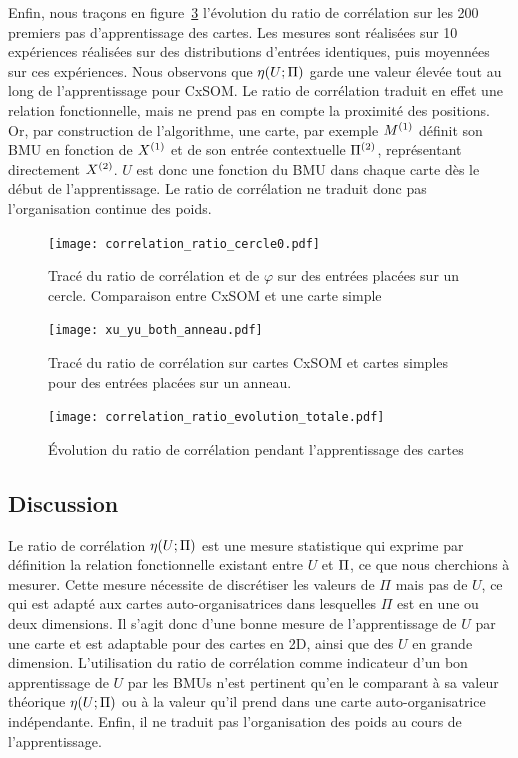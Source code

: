 \documentclass[../main]{subfiles}
\begin{document}
Enfin, nous traçons en figure~\ref{fig:cr_evol} l'évolution du ratio de corrélation sur les 200 premiers pas d'apprentissage des cartes. 
Les mesures sont réalisées sur 10 expériences réalisées sur des distributions d'entrées identiques, puis moyennées sur ces expériences.
Nous observons que $\eta(U;\Pi)$ garde une valeur élevée tout au long de l'apprentissage pour CxSOM.
Le ratio de corrélation traduit en effet une relation fonctionnelle, mais ne prend pas en compte la proximité des positions. 
Or, par construction de l'algorithme, une carte, par exemple $M^{({1})}$ définit son BMU en fonction de $X^{({1})}$ et de son entrée contextuelle $\Pi^{({2})}$, représentant directement $X^{({2})}$. $U$ est donc une fonction du BMU dans chaque carte dès le début de l'apprentissage. Le ratio de corrélation ne traduit donc pas l'organisation continue des poids.

\begin{figure}
    \centering\texttt{[image: correlation\_ratio\_cercle0.pdf]}
    \caption{Tracé du ratio de corrélation et de $\varphi$ sur des entrées placées sur un cercle. Comparaison entre CxSOM et une carte simple \label{fig:cr_xp}}
\end{figure}

\begin{figure}
   \centering \texttt{[image: xu\_yu\_both\_anneau.pdf]}
    \caption{Tracé du ratio de corrélation sur cartes CxSOM et cartes simples pour des entrées placées sur un anneau.\label{fig:cr_bruit}}
\end{figure}

\begin{figure}
    \texttt{[image: correlation\_ratio\_evolution\_totale.pdf]}
    \caption{\'Evolution du ratio de corrélation pendant l'apprentissage des cartes\label{fig:cr_evol}}
\end{figure}

\subsection{Discussion}

Le ratio de corrélation $\eta(U;\Pi)$ est une mesure statistique qui exprime par définition la relation fonctionnelle existant entre $U$ et $\Pi$, ce que nous cherchions à mesurer. 
Cette mesure nécessite de discrétiser les valeurs de $\Pi$ mais pas de $U$, ce qui est adapté aux cartes auto-organisatrices dans lesquelles $\Pi$ est en une ou deux dimensions. Il s'agit donc d'une bonne mesure de l'apprentissage de $U$ par une carte et est adaptable pour des cartes en 2D, ainsi que des $U$ en grande dimension.
L'utilisation du ratio de corrélation comme indicateur d'un bon apprentissage de $U$ par les BMUs n'est pertinent qu'en le comparant à sa valeur théorique $\eta(U;\Pi)$ ou à la valeur qu'il prend dans une carte auto-organisatrice indépendante.
Enfin, il ne traduit pas l'organisation des poids au cours de l'apprentissage.
\end{document}
